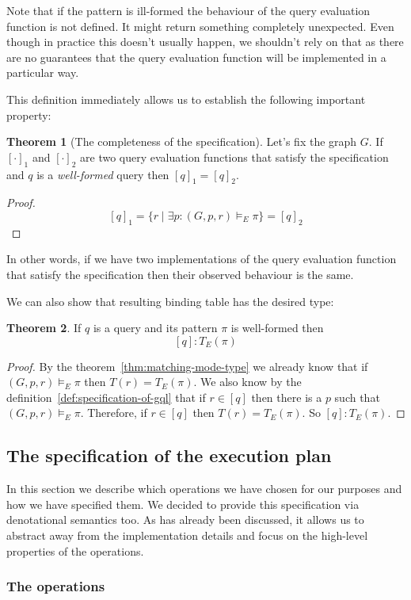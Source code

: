 \documentclass[14pt]{constructor-thesis}
\theoremstyle{definition}
\newtheorem{theorem}{Theorem}
\begin{document}
Note that if the pattern is ill-formed the behaviour of the query evaluation function is not defined. It might return something completely unexpected. Even though in practice this doesn't usually happen, we shouldn't rely on that as there are no guarantees that the query evaluation function will be implemented in a particular way.

This definition immediately allows us to establish the following important property:
\begin{theorem}[The completeness of the specification]
  Let's fix the graph $G$.
  If $[\cdot]_1$ and $[\cdot]_2$ are two query evaluation functions that satisfy the specification and $q$ is a \textit{well-formed} query then $[q]_1 = [q]_2$.
\end{theorem}
\begin{proof}
  $$[q]_1 = \{ r \mid \exists p : (G, p, r) \models_E \pi \} = [q]_2$$
\end{proof}

In other words, if we have two implementations of the query evaluation function that satisfy the specification then their observed behaviour is the same.

We can also show that resulting binding table has the desired type:
\begin{theorem}
  If $q$ is a query and its pattern $\pi$ is well-formed then
  $$[q] : T_E(\pi)$$
\end{theorem}
\begin{proof}
  By the theorem~\ref{thm:matching-mode-type} we already know that if $(G, p, r) \models_E \pi$ then $T(r) = T_E(\pi)$. We also know by the definition~\ref{def:specification-of-gql} that if $r \in [q]$ then there is a $p$ such that $(G, p, r) \models_E \pi$. Therefore, if $r \in [q]$ then $T(r) = T_E(\pi)$. So $[q] : T_E(\pi)$.
\end{proof}

\subsection{The specification of the execution plan}

In this section we describe which operations we have chosen for our purposes and how we have specified them. We decided to provide this specification via denotational semantics too. As has already been discussed, it allows us to abstract away from the implementation details and focus on the high-level properties of the operations.

\subsubsection{The operations}
\end{document}
